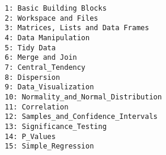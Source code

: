 \documentclass[12pt,article]{article}
\begin{document}
\large
\begin{verbatim}
1: Basic Building Blocks
2: Workspace and Files
3: Matrices, Lists and Data Frames
4: Data Manipulation
5: Tidy Data
6: Merge and Join
7: Central_Tendency
8: Dispersion
9: Data_Visualization
10: Normality_and_Normal_Distribution
11: Correlation
12: Samples_and_Confidence_Intervals
13: Significance_Testing
14: P_Values
15: Simple_Regression
\end{verbatim}
\end{document}
